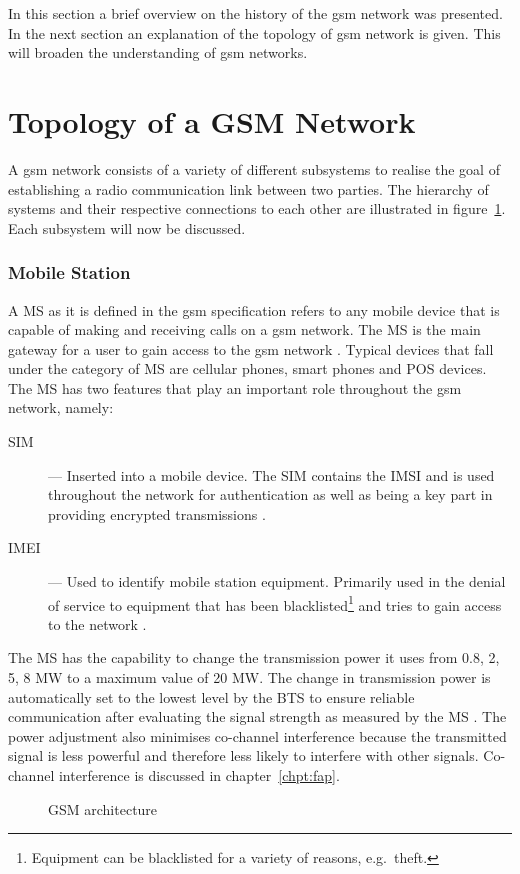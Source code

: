In this section a brief overview on the history of the \gls{gsm} network was presented. In the next section an explanation of the topology of \gls{gsm} network is given. This will broaden the understanding of \gls{gsm} networks.
\section{Topology of a GSM Network}
\label{sec:GSMArch}
A \gls{gsm} network consists of a variety of different subsystems to realise the goal of establishing a radio communication link between two parties. The hierarchy of systems and their respective connections to each other are illustrated in figure~\ref{fig:GSMArchitecture}. Each subsystem will now be discussed.

\subsubsection{Mobile Station}
A \gls{MS}  as it is defined in the \gls{gsm} specification refers to any mobile device that is capable of making and receiving calls on a \gls{gsm} network.  The \gls{MS} is the main gateway 
for a user to gain access to the \gls{gsm} network \cite{Eisenblatter,GSMArchitectureProtocolsServices}. Typical devices that fall under the category of \gls{MS} are cellular phones, smart phones and \gls{POS} devices. The \gls{MS} has two features that play an important role throughout the \gls{gsm} network, namely:
\begin{description}
  \item[\Gls{SIM}] --- Inserted into a mobile device. The \gls{SIM} contains the \gls{IMSI} and is used throughout the network for authentication as well as being a key part in providing encrypted transmissions \cite{Eisenblatter}.
\item[\Gls{IMEI}] --- Used to identify mobile station equipment. Primarily used in the denial of service to equipment that has been blacklisted\footnote{Equipment can be blacklisted for a variety of reasons, e.g.\ theft.} and tries to gain access to the network \cite{Eisenblatter}.
\end{description}
The \gls{MS} has the capability to change the transmission power it uses from 0.8, 2, 5, 8 MW to a maximum value of 20 MW\cite{GSMSysEngin}. The change in transmission power is automatically set to the lowest level by the \gls{BTS} to ensure reliable communication after evaluating the signal strength as measured by the \gls{MS} \cite{GSMSysEngin,GSMArchitectureProtocolsServices}. The power adjustment also minimises co-channel interference because the transmitted signal is less powerful and therefore less likely to interfere with other signals\cite{GSMSysEngin}. Co-channel interference is discussed in chapter~\ref{chpt:fap}.
\begin{figure}[H]
	\begin{centering}
		
		\caption{GSM architecture\cite{GSMArchitectureProtocolsServices}}
		\label{fig:GSMArchitecture}
	\end{centering}
\end{figure}

